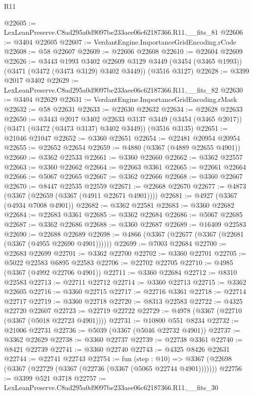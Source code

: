 \begin{lexlean}{R11}
\begin{coremodule}
@22605 := LexLeanPreserve.C8ad295a0d9097be233aee06c62187366.R11.__fits_81
@22606 := @3404 @22605
@22607 := VerdantEngine.ImportanceGridEncoding.rCode
@22608 := @58 @22607
@22609 := @22606 @22608
@22610 := @22604 @22609
@22626 := @3443
    @1993
    @3402
    @22609
    @3129
    @3449
    (@3454 (@3465 @1993))
    (@3471 (@3472 (@3473 @3129) @3402 @3449))
    (@3516 @3127)
@22628 := @3399 @2017 @3402
@22629 := LexLeanPreserve.C8ad295a0d9097be233aee06c62187366.R11.__fits_82
@22630 := @3404 @22629
@22631 := VerdantEngine.ImportanceGridEncoding.rMask
@22632 := @58 @22631
@22633 := @22630 @22632
@22634 := @22628 @22633
@22650 := @3443
    @2017
    @3402
    @22633
    @3137
    @3449
    (@3454 (@3465 @2017))
    (@3471 (@3472 (@3473 @3137) @3402 @3449))
    (@3516 @3135)
@22651 := @21046 @21047
@22652 := @3360 @22651
@22654 := @22481 @20954 @20954
@22655 := @22652 @22654
@22659 := @4880 (@3367 (@4889 @22655 @4901))
@22660 := @3362 @22533
@22661 := @3360 @22660
@22662 := @3362 @22557
@22663 := @3360 @22662
@22664 := @22663 @3361
@22665 := @22661 @22664
@22666 := @5067 @22665
@22667 := @3362 @22666
@22668 := @3360 @22667
@22670 := @8447 @22535 @22559
@22671 := @22668 @22670
@22677 := @4873 (@3367 (@22659 (@3367 (@4911 @22671 @4901))))
@22681 := @4927 (@3367 (@4934 @7008 @4901))
@22682 := @3362 @22581
@22683 := @3360 @22682
@22684 := @22683 @3361
@22685 := @3362 @22684
@22686 := @5067 @22685
@22687 := @3362 @22686
@22688 := @3360 @22687
@22689 := @16409 @22583
@22690 := @22688 @22689
@22698 := @4866 (@3367 (@22677 (@3367 (@22681 (@3367 (@4955 @22690 @4901))))))
@22699 := @7003 @22684
@22700 := @22683 @22699
@22701 := @3362 @22700
@22702 := @3360 @22701
@22705 := @5022 @22583 @6895 @22583
@22706 := @22702 @22705
@22710 := @4985 (@3367 (@4992 @22706 @4901))
@22711 := @3360 @22684
@22712 := @8310 @22583
@22713 := @22711 @22712
@22714 := @3360 @22713
@22715 := @3362 @22605
@22716 := @3360 @22715
@22717 := @22716 @3361
@22718 := @22714 @22717
@22719 := @3360 @22718
@22720 := @8313 @22583
@22722 := @4325 @22720 @22607
@22723 := @22719 @22722
@22729 := @4978 (@3367 (@22710 (@3367 (@5018 @22723 @4901))))
@22731 := @10800 @551 @8234
@22732 := @21006 @22731
@22736 := @5039 (@3367 (@5046 @22732 @4901))
@22737 := @3362 @22629
@22738 := @3360 @22737
@22739 := @22738 @3361
@22740 := @8421 @22739
@22741 := @3360 @22740
@22743 := @4325 @8426 @22631
@22744 := @22741 @22743
@22754 := fun (step : @10) =>
  @3367 (@22698 (@3367 (@22729 (@3367 (@22736 (@3367 (@5065 @22744 @4901)))))))
@22756 := @3399 @521 @3718
@22757 := LexLeanPreserve.C8ad295a0d9097be233aee06c62187366.R11.__fits_30

\end{coremodule}
\end{lexlean}
